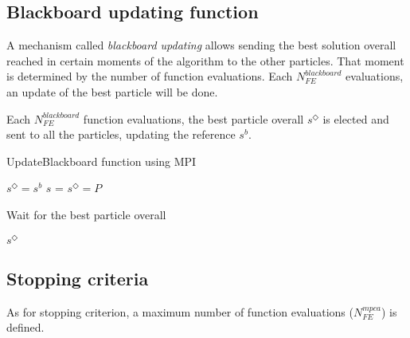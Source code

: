 \subsection{Blackboard updating function}

A mechanism called \textit{blackboard updating} allows sending the best solution overall reached in certain moments of the algorithm to the other particles. That moment is determined by the number of function evaluations. Each $N_{FE}^{blackboard}$ evaluations, an update of the best particle will be done.

Each $N_{FE}^{blackboard}$ function evaluations, the best particle overall $s^{\Diamond}$ is elected and sent to all the particles, updating the reference $s^b$.

\begin{algorithm}[H]
\caption{UpdateBlackboard function using MPI}
\label{alg:mpcaBlackboard}
\footnotesize
\begin{algorithmic}[1]
\State $s^{\Diamond} = s^b$
\State $s$ =  
\State $s^{\Diamond} = P$ 
\EndIf
\EndFor
\State {} 
\Else {}
\State {} 
\State {} \Comment\parbox[t]{.55\linewidth}{{Wait for the best particle overall}}
\EndIf

\State \Return $s^{\Diamond}$
\EndFunction
\end{algorithmic}
\end{algorithm}

\subsection{Stopping criteria}

As for stopping criterion, a maximum number of function evaluations ($N_{FE}^{mpca}$) is defined. 
